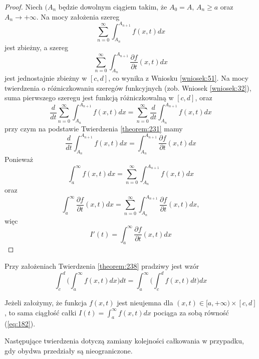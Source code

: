 \documentclass[leqno]{article}
\begin{document}
\begin{justify}
\begin{proof}
    Niech $(A_n$ będzie dowolnym ciągiem takim, że $A_0 = A$, $A_n \geqslant a$ oraz $A_n \to +\infty$.
    Na mocy założenia szereg 
    \[
        \sum_{n=0}^{\infty}\int_{A_n}^{A_{n+1}}f(x,t)dx
    \]
    jest zbieżny, a szereg 
    \[
        \sum_{n=0}^{\infty}\int_{A_n}^{A_{n+1}}\frac{\partial f}{\partial t}(x,t)dx
    \]
    jest jednostajnie zbieżny w $[c,d]$, co wynika z Wniosku \ref{wniosek:51}. Na mocy twierdzenia o różniczkowaniu szeregów funkcyjnych
    (zob. Wniosek \ref{wniosek:32}), suma pierwszego szeregu jest funkcją różniczkowalną w $[c,d]$, oraz 
    \[
        \frac{d}{dt}\sum_{n=0}^{\infty}\int_{A_n}^{A_{n+1}}f(x,t)dx = \sum_{n=0}^{\infty}\frac{d}{dt}\int_{A_n}^{A_{n+1}}f(x,t)dx
    \]
    przy czym na podstawie Twierdzenia \ref{theorem:231} mamy 
    \[
        \frac{d}{dt}\int_{A_n}^{A_{n+1}}f(x,t)dx = \int_{A_n}^{A_{n+1}}\frac{\partial f}{\partial t}(x,t)dx
    \]
    Ponieważ 
    \[
        \int_{a}^{\infty}f(x,t)dx = \sum_{n=0}^{\infty}\int_{A_n}^{A_{n+1}}f(x,t)dx 
    \]
    oraz 
    \[
        \int_{a}^{\infty}\frac{\partial f}{\partial t}(x,t)dx = \sum_{n=0}^{\infty}\int_{A_n}^{A_{n+1}}\frac{\partial f}{\partial t}(x,t)dx,
    \]
    więc 
    \[
        I'(t) = \int_{a}^{\infty}\frac{\partial f}{\partial t}(x,t)dx
    \]
\end{proof}

\begin{theorem}
{
    Przy założeniach Twierdzenia \ref{theorem:238} pradziwy jest wzór 
    \begin{equation}\label{eq:182}
        \int_{c}^{d}\Big( \int_{a}^{\infty}f(x,t)dx \Big)dt = \int_{a}^{\infty}\Big( \int_{c}^{d}f(x,t)dt\Big)dx
    \end{equation}
}
\end{theorem}

Jeżeli założymy, że funkcja $f(x,t)$ jest nieujemna dla $(x,t) \in [a,+\infty) \times [c,d]$, to sama ciągłość całki $I(t) = \int_{a}^{\infty}f(x,t)dx$ pociąga za sobą równość (\ref{eq:182}).

Następujące twierdzenia dotyczą zamiany kolejności całkowania w przypadku, gdy obydwa przedziały są nieograniczone.


\end{justify}
\end{document}
